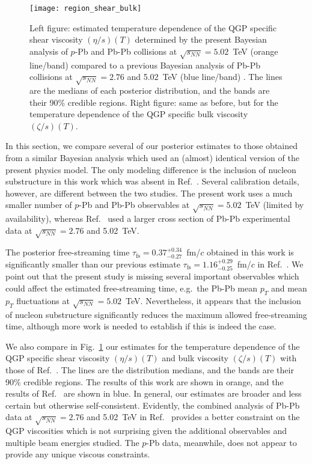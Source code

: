 \documentclass[aps,prc,reprint,amsmath,nofootinbib]{revtex4-1}
\newcommand{\sqrts}{\sqrt{s_{NN}}}
\newcommand{\taufs}{\tau_\mathrm{fs}}
\begin{document}
\begin{figure}
  \texttt{[image: region\_shear\_bulk]}
  \caption{Left figure: estimated temperature dependence of the QGP specific shear viscosity $(\eta/s)(T)$ determined by the present Bayesian analysis of $p$-Pb and Pb-Pb collisions at $\sqrts=5.02$~TeV (orange line/band) compared to a previous Bayesian analysis of Pb-Pb collisions at $\sqrts=2.76$ and 5.02~TeV (blue line/band) \cite{Bernhard:2018hnz}. The lines are the medians of each posterior distribution, and the bands are their 90\% credible regions. Right figure: same as before, but for the temperature dependence of the QGP specific bulk viscosity $(\zeta/s)(T)$.}
  \label{fig:region_shear_bulk}
\end{figure}

In this section, we compare several of our posterior estimates to those obtained from a similar Bayesian analysis \cite{Bernhard:2018hnz} which used an (almost) identical version of the present physics model.
The only modeling difference is the inclusion of nucleon substructure in this work which was absent in Ref.~\cite{Bernhard:2018hnz}.
Several calibration details, however, are different between the two studies.
The present work uses a much smaller number of $p$-Pb and Pb-Pb observables at $\sqrts=5.02$~TeV (limited by availability), whereas Ref.~\cite{Bernhard:2018hnz} used a larger cross section of Pb-Pb experimental data at $\sqrts=2.76$ and 5.02~TeV.

The posterior free-streaming time $\taufs=0.37_{-0.27}^{+0.34}$~fm/$c$ obtained in this work is significantly smaller than our previous estimate $\taufs=1.16_{-0.25}^{+0.29}$~fm/$c$ in Ref.~\cite{Bernhard:2018hnz}.
We point out that the present study is missing several important observables which could affect the estimated free-streaming time, e.g.\ the Pb-Pb mean $p_T$ and mean $p_T$ fluctuations at $\sqrts=5.02$~TeV.
Nevertheless, it appears that the inclusion of nucleon substructure significantly reduces the maximum allowed free-streaming time, although more work is needed to establish if this is indeed the case.

We also compare in Fig.~\ref{fig:region_shear_bulk} our estimates for the temperature dependence of the QGP specific shear viscosity $(\eta/s)(T)$ and bulk viscosity $(\zeta/s)(T)$ with those of Ref.~\cite{Bernhard:2018hnz}.
The lines are the distribution medians, and the bands are their 90\% credible regions.
The results of this work are shown in orange, and the results of Ref.~\cite{Bernhard:2018hnz} are shown in blue.
In general, our estimates are broader and less certain but otherwise self-consistent.
Evidently, the combined analysis of Pb-Pb data at $\sqrts=2.76$ and 5.02~TeV in Ref.~\cite{Bernhard:2018hnz} provides a better constraint on the QGP viscosities which is not surprising given the additional observables and multiple beam energies studied.
The $p$-Pb data, meanwhile, does not appear to provide any unique viscous constraints.
\end{document}

